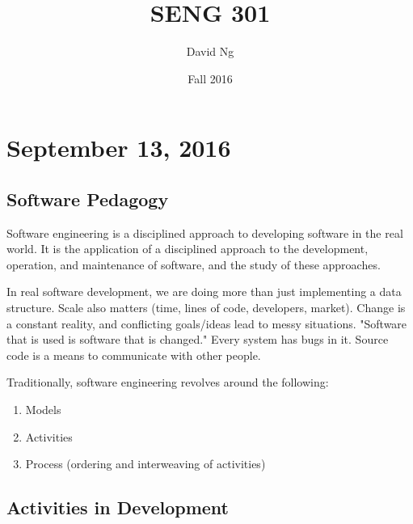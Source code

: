 \documentclass[11pt]{article}
\theoremstyle{plain} %
\theoremstyle{definition}
\theoremstyle{example}
\theoremstyle{remark}
\begin{document}
\title{SENG 301}
\author{David Ng}
\date{Fall 2016}
\maketitle

\tableofcontents

\eject


\section{September 13, 2016}

\subsection{Software Pedagogy}

Software engineering is a disciplined approach to developing software in the real world. It is the application of a disciplined approach to the development, operation, and maintenance of software, and the study of these approaches. 

In real software development, we are doing more than just implementing a data structure. Scale also matters (time, lines of code, developers, market). Change is a constant reality, and conflicting goals/ideas lead to messy situations. "Software that is used is software that is changed." Every system has bugs in it. Source code is a means to communicate with other people. 

Traditionally, software engineering revolves around the following:

\begin{enumerate}
	\item Models
	\item Activities
	\item Process (ordering and interweaving of activities)
\end{enumerate}

\subsection{Activities in Development}
 
\end{document}
